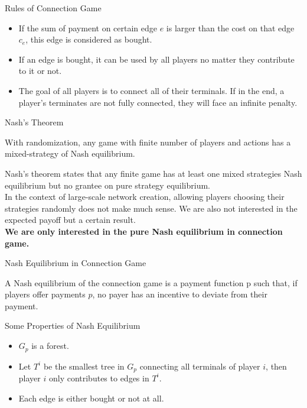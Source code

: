 \documentclass[11pt,aspectratio=169]{beamer}
\begin{document}
\begin{frame}{Rules of Connection Game}
\begin{definition}
    \begin{itemize}
    \item If the sum of payment on certain edge \(e\) is larger than the cost on that edge \(c_e\), this edge is considered as bought.
    \item If an edge is bought, it can be used by all players no matter they contribute to it or not. \\
    \item The goal of all players is to connect all of their terminals. If in the end, a player's terminates are not fully connected, they will face an infinite penalty.  
    \end{itemize}
    \end{definition}
\end{frame}

\begin{frame}{Nash's Theorem}
    \begin{theorem}
        With randomization, any game with finite number of players and actions has a mixed-strategy of Nash equilibrium.
    \end{theorem}
    Nash's theorem states that any finite game has at least one mixed strategies Nash equilibrium but no grantee on pure strategy equilibrium.\\ 
    \vspace{10pt}
    In the context of large-scale network creation, allowing players choosing their strategies randomly does not make much sense. We are also not interested in the expected payoff but a certain result.\\
    \vspace{10pt}
    \textbf{We are only interested in the pure Nash equilibrium in connection game.}
\end{frame}

\begin{frame}{Nash Equilibrium in Connection Game}
    \begin{definition}
       A Nash equilibrium of the connection game is a payment function p such that, if players offer payments \(p\), no payer has an incentive to deviate from their payment. 
   \end{definition}
\end{frame}

\begin{frame}{Some Properties of Nash Equilibrium}
    \begin{itemize}
        \item \(G_p\) is a forest.
        \item Let \(T^i\) be the smallest tree in \(G_p\) connecting all terminals of player \(i\), then player \(i\) only contributes to edges in \(T^i\).
        \item Each edge is either bought or not at all. 
    \end{itemize}
\end{frame}
\end{document}
